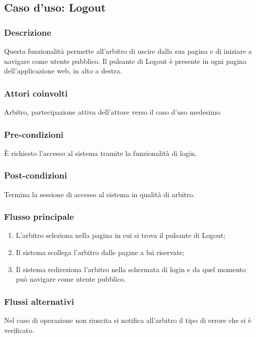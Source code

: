 %
%
\subsection{Caso d'uso: Logout}

\subsubsection*{Descrizione}
Questa funzionalità permette all'arbitro di uscire dalla sua pagina e di iniziare a navigare come utente pubblico.
Il pulsante di Logout è presente in ogni pagina dell'applicazione web, in alto a destra.

\subsubsection*{Attori coinvolti}
Arbitro, partecipazione attiva dell'attore verso il caso d'uso medesimo.

\subsubsection*{Pre-condizioni}
È richiesto l'accesso al sistema tramite la funzionalità di login.

\subsubsection*{Post-condizioni}
Termina la sessione di accesso al sistema in qualità di arbitro.

\subsubsection*{Flusso principale}

\begin{enumerate}
	
	\item
	L'arbitro seleziona nella pagina in cui si trova il pulsante di Logout;
	
	\item
	Il sistema scollega l'arbitro dalle pagine a lui riservate;
	
	\item
	Il sistema redireziona l'arbitro nella schermata di login e da quel momento può navigare come utente pubblico.
	
\end{enumerate}

\subsubsection*{Flussi alternativi}
Nel caso di operazione non riuscita si notifica all'arbitro il tipo di errore che si è verificato.

